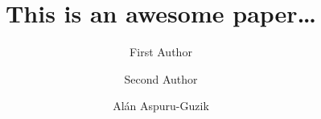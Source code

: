 \documentclass[journal=jacsat,manuscript=article]{achemso}
\author{First Author}
\affiliation[CHEM]{\addressCHEM}
\author{Second Author}
\affiliation[CHEM]{\addressCHEM}
\author{Al\'an Aspuru-Guzik}
\affiliation[CHEM]{\addressCHEM}
\title{This is an awesome paper\dots}
\begin{document}







\begin{abstract}

\end{abstract}



\begin{acknowledgement}

\end{acknowledgement}

\begin{suppinfo}

\end{suppinfo}


\end{document}
